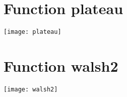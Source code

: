 \section{Function plateau}
\begin{center}

\end{center}
\begin{center}
\texttt{[image: plateau]}
\end{center}
\newpage
\section{Function walsh2}
\begin{center}

\end{center}
\begin{center}
\texttt{[image: walsh2]}
\end{center}
